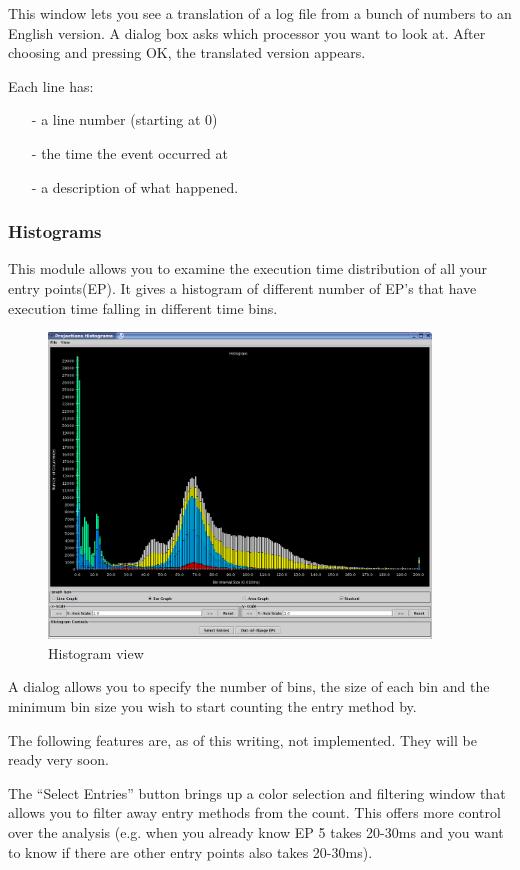 \documentclass[10pt]{article}
\begin{document}
This window lets you see a translation of a log file from a bunch of
numbers to an English version.  A dialog box asks which processor you
want to look at.  After choosing and pressing OK, the translated
version appears.

Each line has:
\begin{itemize}
\item[-] a line number (starting at 0)
\item[-] the time the event occurred at
\item[-] a description of what happened.
\end{itemize}

\subsubsection{Histograms}

This module allows you to examine the execution time distribution of all your
entry points(EP). It gives a histogram of different number of EP's that have
execution time falling in different time bins.

\begin{figure}[htb]
\center
\includegraphics[width=4.0in]{fig/histogram}
\caption{Histogram view}
\label{histogram}
\end{figure}

A dialog allows you to specify the number of bins, the size of each
bin and the minimum bin size you wish to start counting the entry
method by.

The following features are, as of this writing, not implemented. They
will be ready very soon.

The ``Select Entries'' button brings up a color selection and
filtering window that allows you to filter away entry methods from the
count. This offers more control over the analysis (e.g. when you
already know EP 5 takes 20-30ms and you want to know if there
are other entry points also takes 20-30ms).
\end{document}
